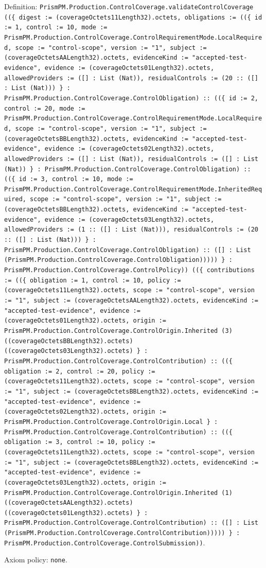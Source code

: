\documentclass[11pt]{article}
\begin{document}
\noindent Definition: \texttt{PrismPM.Production.ControlCoverage.validateControlCoverage ((\{ digest := (coverageOctets11Length32).octets, obligations := ((\{ id := 1, control := 10, mode := PrismPM.Production.ControlCoverage.ControlRequirementMode.LocalRequired, scope := "control-scope", version := "1", subject := (coverageOctetsAALength32).octets, evidenceKind := "accepted-test-evidence", evidence := (coverageOctets01Length32).octets, allowedProviders := ([] : List (Nat)), residualControls := (20 :: ([] : List (Nat))) \} : PrismPM.Production.ControlCoverage.ControlObligation) :: ((\{ id := 2, control := 20, mode := PrismPM.Production.ControlCoverage.ControlRequirementMode.LocalRequired, scope := "control-scope", version := "1", subject := (coverageOctetsBBLength32).octets, evidenceKind := "accepted-test-evidence", evidence := (coverageOctets02Length32).octets, allowedProviders := ([] : List (Nat)), residualControls := ([] : List (Nat)) \} : PrismPM.Production.ControlCoverage.ControlObligation) :: ((\{ id := 3, control := 10, mode := PrismPM.Production.ControlCoverage.ControlRequirementMode.InheritedRequired, scope := "control-scope", version := "1", subject := (coverageOctetsBBLength32).octets, evidenceKind := "accepted-test-evidence", evidence := (coverageOctets03Length32).octets, allowedProviders := (1 :: ([] : List (Nat))), residualControls := (20 :: ([] : List (Nat))) \} : PrismPM.Production.ControlCoverage.ControlObligation) :: ([] : List (PrismPM.Production.ControlCoverage.ControlObligation))))) \} : PrismPM.Production.ControlCoverage.ControlPolicy)) ((\{ contributions := ((\{ obligation := 1, control := 10, policy := (coverageOctets11Length32).octets, scope := "control-scope", version := "1", subject := (coverageOctetsAALength32).octets, evidenceKind := "accepted-test-evidence", evidence := (coverageOctets01Length32).octets, origin := PrismPM.Production.ControlCoverage.ControlOrigin.Inherited (3) ((coverageOctetsBBLength32).octets) ((coverageOctets03Length32).octets) \} : PrismPM.Production.ControlCoverage.ControlContribution) :: ((\{ obligation := 2, control := 20, policy := (coverageOctets11Length32).octets, scope := "control-scope", version := "1", subject := (coverageOctetsBBLength32).octets, evidenceKind := "accepted-test-evidence", evidence := (coverageOctets02Length32).octets, origin := PrismPM.Production.ControlCoverage.ControlOrigin.Local \} : PrismPM.Production.ControlCoverage.ControlContribution) :: ((\{ obligation := 3, control := 10, policy := (coverageOctets11Length32).octets, scope := "control-scope", version := "1", subject := (coverageOctetsBBLength32).octets, evidenceKind := "accepted-test-evidence", evidence := (coverageOctets03Length32).octets, origin := PrismPM.Production.ControlCoverage.ControlOrigin.Inherited (1) ((coverageOctetsAALength32).octets) ((coverageOctets01Length32).octets) \} : PrismPM.Production.ControlCoverage.ControlContribution) :: ([] : List (PrismPM.Production.ControlCoverage.ControlContribution))))) \} : PrismPM.Production.ControlCoverage.ControlSubmission))}.\par
\noindent Axiom policy: \texttt{none}.\par
\end{document}
